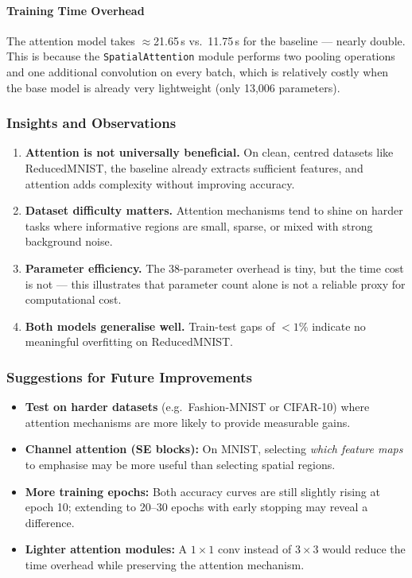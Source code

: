 \paragraph{Training Time Overhead}

The attention model takes $\approx$21.65\,s vs.\ 11.75\,s for the baseline --- nearly
double. This is because the \texttt{SpatialAttention} module performs two pooling
operations and one additional convolution on every batch, which is relatively costly
when the base model is already very lightweight (only 13,006 parameters).

\subsubsection{Insights and Observations}

\begin{enumerate}[leftmargin=1.5em]
    \item \textbf{Attention is not universally beneficial.} On clean, centred datasets
	    like ReducedMNIST, the baseline already extracts sufficient features, and
	    attention adds complexity without improving accuracy.
    \item \textbf{Dataset difficulty matters.} Attention mechanisms tend to shine on
	    harder tasks where informative regions are small, sparse, or mixed with
	    strong background noise.
    \item \textbf{Parameter efficiency.} The 38-parameter overhead is tiny, but the
	    time cost is not --- this illustrates that parameter count alone is not a
	    reliable proxy for computational cost.
    \item \textbf{Both models generalise well.} Train-test gaps of $<1\%$ indicate
	    no meaningful overfitting on ReducedMNIST.
\end{enumerate}

\subsubsection{Suggestions for Future Improvements}

\begin{itemize}[leftmargin=1.5em]
    \item \textbf{Test on harder datasets} (e.g.\ Fashion-MNIST or CIFAR-10) where
	    attention mechanisms are more likely to provide measurable gains.
    \item \textbf{Channel attention (SE blocks):} On MNIST, selecting \emph{which
	    feature maps} to emphasise may be more useful than selecting spatial regions.
    \item \textbf{More training epochs:} Both accuracy curves are still slightly
	    rising at epoch 10; extending to 20--30 epochs with early stopping may
	    reveal a difference.
    \item \textbf{Lighter attention modules:} A $1\times1$ conv instead of $3\times3$
	    would reduce the time overhead while preserving the attention mechanism.
\end{itemize}


